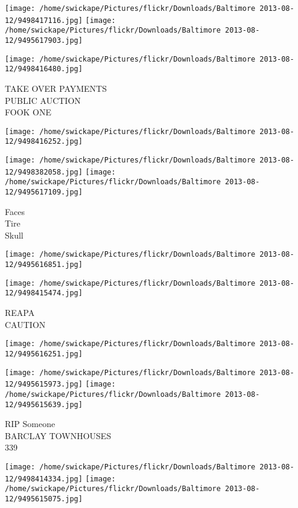 \documentclass[10pt,letterpaper]{article}
\begin{document}
\texttt{[image: /home/swickape/Pictures/flickr/Downloads/Baltimore 2013-08-12/9498417116.jpg]}
\texttt{[image: /home/swickape/Pictures/flickr/Downloads/Baltimore 2013-08-12/9495617903.jpg]}

\texttt{[image: /home/swickape/Pictures/flickr/Downloads/Baltimore 2013-08-12/9498416480.jpg]}

TAKE OVER PAYMENTS\\
PUBLIC AUCTION\\
FOOK ONE\\
\pagebreak

\texttt{[image: /home/swickape/Pictures/flickr/Downloads/Baltimore 2013-08-12/9498416252.jpg]}

\vspace{0.25in}
\texttt{[image: /home/swickape/Pictures/flickr/Downloads/Baltimore 2013-08-12/9498382058.jpg]}
\texttt{[image: /home/swickape/Pictures/flickr/Downloads/Baltimore 2013-08-12/9495617109.jpg]}

Faces\\
Tire\\
Skull\\
\pagebreak

\texttt{[image: /home/swickape/Pictures/flickr/Downloads/Baltimore 2013-08-12/9495616851.jpg]}

\vspace{0.25in}
\texttt{[image: /home/swickape/Pictures/flickr/Downloads/Baltimore 2013-08-12/9498415474.jpg]}

REAPA\\
CAUTION\\
\pagebreak

\texttt{[image: /home/swickape/Pictures/flickr/Downloads/Baltimore 2013-08-12/9495616251.jpg]}

\vspace{0.25in}
\texttt{[image: /home/swickape/Pictures/flickr/Downloads/Baltimore 2013-08-12/9495615973.jpg]}
\texttt{[image: /home/swickape/Pictures/flickr/Downloads/Baltimore 2013-08-12/9495615639.jpg]}

RIP Someone\\
BARCLAY TOWNHOUSES\\
339\\
\pagebreak

\texttt{[image: /home/swickape/Pictures/flickr/Downloads/Baltimore 2013-08-12/9498414334.jpg]}
\texttt{[image: /home/swickape/Pictures/flickr/Downloads/Baltimore 2013-08-12/9495615075.jpg]}
\end{document}
